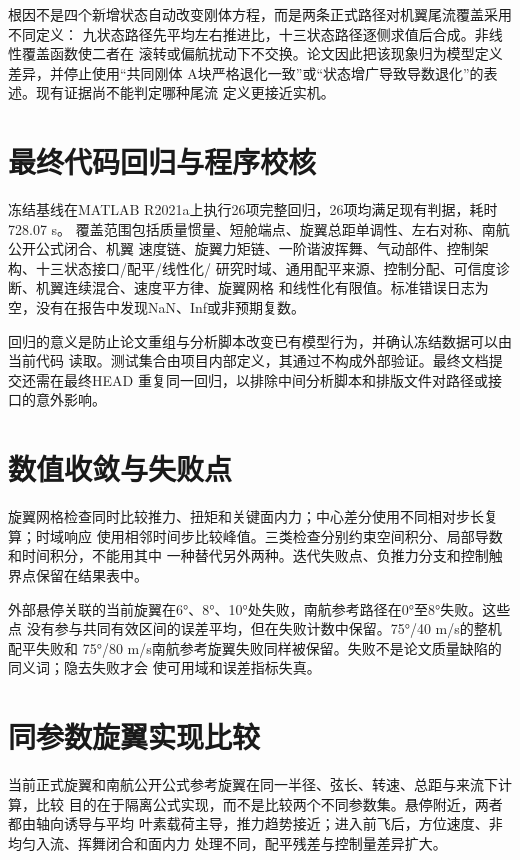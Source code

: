 \documentclass[UTF8,12pt,oneside,openany,fontset=windows]{ctexbook}
\begin{document}
根因不是四个新增状态自动改变刚体方程，而是两条正式路径对机翼尾流覆盖采用不同定义： 九状态路径先平均左右推进比，十三状态路径逐侧求值后合成。非线性覆盖函数使二者在 滚转或偏航扰动下不交换。论文因此把该现象归为模型定义差异，并停止使用“共同刚体 A块严格退化一致”或“状态增广导致导数退化”的表述。现有证据尚不能判定哪种尾流 定义更接近实机。

\section{最终代码回归与程序校核}

冻结基线在MATLAB R2021a上执行26项完整回归，26项均满足现有判据，耗时728.07 s。 覆盖范围包括质量惯量、短舱端点、旋翼总距单调性、左右对称、南航公开公式闭合、机翼 速度链、旋翼力矩链、一阶谐波挥舞、气动部件、控制架构、十三状态接口/配平/线性化/ 研究时域、通用配平来源、控制分配、可信度诊断、机翼连续混合、速度平方律、旋翼网格 和线性化有限值。标准错误日志为空，没有在报告中发现NaN、Inf或非预期复数。

回归的意义是防止论文重组与分析脚本改变已有模型行为，并确认冻结数据可以由当前代码 读取。测试集合由项目内部定义，其通过不构成外部验证。最终文档提交还需在最终HEAD 重复同一回归，以排除中间分析脚本和排版文件对路径或接口的意外影响。

\section{数值收敛与失败点}

旋翼网格检查同时比较推力、扭矩和关键面内力；中心差分使用不同相对步长复算；时域响应 使用相邻时间步比较峰值。三类检查分别约束空间积分、局部导数和时间积分，不能用其中 一种替代另外两种。迭代失败点、负推力分支和控制触界点保留在结果表中。

外部悬停关联的当前旋翼在6°、8°、10°处失败，南航参考路径在0°至8°失败。这些点 没有参与共同有效区间的误差平均，但在失败计数中保留。75°/40 m/s的整机配平失败和 75°/80 m/s南航参考旋翼失败同样被保留。失败不是论文质量缺陷的同义词；隐去失败才会 使可用域和误差指标失真。

\section{同参数旋翼实现比较}

当前正式旋翼和南航公开公式参考旋翼在同一半径、弦长、转速、总距与来流下计算，比较 目的在于隔离公式实现，而不是比较两个不同参数集。悬停附近，两者都由轴向诱导与平均 叶素载荷主导，推力趋势接近；进入前飞后，方位速度、非均匀入流、挥舞闭合和面内力 处理不同，配平残差与控制量差异扩大。
\end{document}
